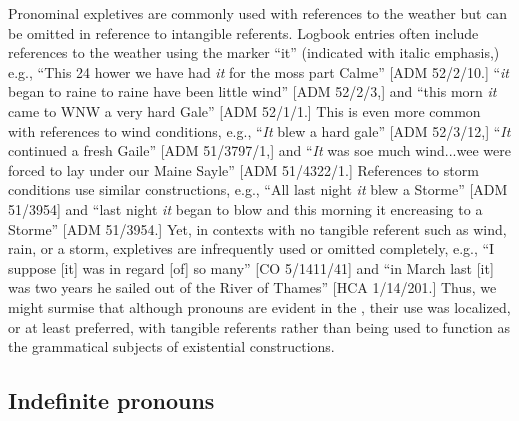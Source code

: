 Pronominal expletives are commonly used with references to the weather but can be omitted in reference to intangible referents.  Logbook entries often include references to the weather using the  marker “it” (indicated with italic emphasis,) e.g., “This 24 hower we have had \textit{it} for the moss part Calme” [ADM 52/2/10.] “\textit{it} began to raine to raine have been little wind” [ADM 52/2/3,] and “this morn \textit{it} came to WNW a very hard Gale” [ADM 52/1/1.] This is even more common with references to wind conditions, e.g., “\textit{It} blew a hard gale” [ADM 52/3/12,] “\textit{It} continued a fresh Gaile” [ADM 51/3797/1,] and “\textit{It} was soe much wind...wee were forced to lay under our Maine Sayle” [ADM 51/4322/1.] References to storm conditions use similar constructions, e.g., “All last night \textit{it} blew a Storme” [ADM 51/3954] and “last night \textit{it} began to blow and this morning it encreasing to a Storme” [ADM 51/3954.] Yet, in contexts with no tangible referent such as wind, rain, or a storm, expletives are infrequently used or omitted completely, e.g., “I suppose [it] was in regard [of] so many” [CO 5/1411/41] and “in March last [it] was two years he sailed out of the River of Thames” [HCA 1/14/201.] Thus, we might surmise that although  pronouns are evident in the , their use was localized, or at least preferred, with tangible referents rather than being used to function as the grammatical subjects of existential constructions.

\subsection{{Indefinite pronouns}}%

